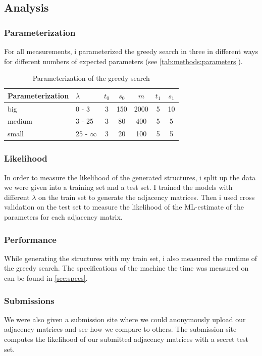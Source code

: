\documentclass[sigconf, fleqn, prologue, dvipsnames]{acmart}
\begin{document}
\subsection{Analysis}
\subsubsection{Parameterization}
\label{sec:methods:analysis:parameterization}
For all measurements, i parameterized the greedy search in three in different ways for different numbers of expected parameters (see \autoref{tab:methods:parameters}).

\begin{table}[htbp]
	\caption{Parameterization of the greedy search}
	\label{tab:methods:parameters}
	\begin{tabular}{llccccc}
		\toprule
		Parameterization & $\lambda$     & $t_0$ & $s_0$ & $m$  & $t_1$ & $s_1$ \\
		\midrule
		big              & 0 - 3         & 3     & 150   & 2000 & 5     & 10    \\
		medium           & 3 - 25        & 3     & 80    & 400  & 5     & 5     \\
		small            & 25 - $\infty$ & 3     & 20    & 100  & 5     & 5     \\
		\bottomrule
	\end{tabular}
\end{table}

\subsubsection{Likelihood}
In order to measure the likelihood of the generated structures, i split up the data we were given into a training set and a test set.
I trained the models with different $\lambda$ on the train set to generate the adjacency matrices.
Then i used cross validation on the test set to measure the likelihood of the ML-estimate of the parameters for each adjacency matrix.

\subsubsection{Performance}
While generating the structures with my train set, i also measured the runtime of the greedy search.
The specifications of the machine the time was measured on can be found in \autoref{sec:specs}.

\subsubsection{Submissions}
We were also given a submission site where we could anonymously upload our adjacency matrices and see how we compare to others.
The submission site computes the likelihood of our submitted adjacency matrices with a secret test set.
\end{document}
